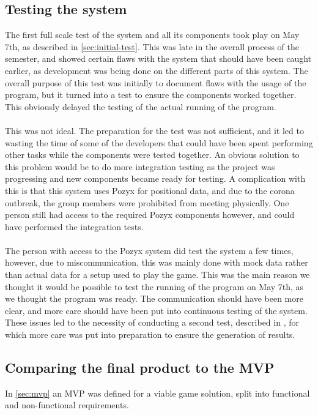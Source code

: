 \subsection{Testing the system}
The first full scale test of the system and all its components took play on May 7th, as described in \autoref{sec:initial-test}.
This was late in the overall process of the semester, and showed certain flaws with the system that should have been caught earlier, as development was being done on the different parts of this system.
The overall purpose of this test was initially to document flaws with the usage of the program, but it turned into a test to ensure the components worked together.
This obviously delayed the testing of the actual running of the program.
\\\\
This was not ideal.
The preparation for the test was not sufficient, and it led to wasting the time of some of the developers that could have been spent performing other tasks while the components were tested together.
An obvious solution to this problem would be to do more integration testing as the project was progressing and new components became ready for testing.
A complication with this is that this system uses Pozyx for positional data, and due to the corona outbreak, the group members were prohibited from meeting physically.
One person still had access to the required Pozyx components however, and could have performed the integration tests.
\\\\
The person with access to the Pozyx system did test the system a few times, however, due to miscommunication, this was mainly done with mock data rather than actual data for a setup used to play the game.
This was the main reason we thought it would be possible to test the running of the program on May 7th, as we thought the program was ready.
The communication should have been more clear, and more care should have been put into continuous testing of the system.
These issues led to the necessity of conducting a second test, described in , for which more care was put into preparation to ensure the generation of results.

\subsection{Comparing the final product to the MVP}
In \autoref{sec:mvp} an MVP was defined for a viable game solution, split into functional and non-functional requirements.


